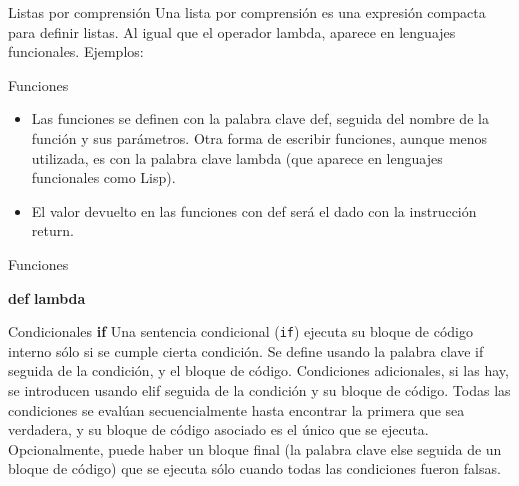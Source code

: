 \documentclass[handout,hyperref={colorlinks=true}]{beamer}
\begin{document}
\begin{frame}{Listas por comprensión}
Una lista por comprensión es una expresión compacta para definir listas. Al igual que el operador lambda, aparece en lenguajes funcionales. Ejemplos:

\lstI
\end{frame}





\begin{frame}{Funciones}
\begin{itemize}

  \item<+->  Las funciones se definen con la palabra clave def, seguida del nombre de la función y sus parámetros. Otra forma de escribir funciones, aunque menos utilizada, es con la palabra clave lambda (que aparece en lenguajes funcionales como Lisp).
  \item<+->  El valor devuelto en las funciones con def será el dado con la instrucción return.
  \end{itemize}

\end{frame}
\begin{frame}{Funciones}

 \textbf{def}
\lstI
\textbf{lambda}
\lstII
\end{frame}


\begin{frame}{Condicionales}
\textbf{if} Una sentencia condicional (\verb~if~) ejecuta su bloque de código interno sólo si se cumple cierta condición. Se define usando la palabra clave if seguida de la condición, y el bloque de código. Condiciones adicionales, si las hay, se introducen usando elif seguida de la condición y su bloque de código. Todas las condiciones se evalúan secuencialmente hasta encontrar la primera que sea verdadera, y su bloque de código asociado es el único que se ejecuta. Opcionalmente, puede haber un bloque final (la palabra clave else seguida de un bloque de código) que se ejecuta sólo cuando todas las condiciones fueron falsas.

\end{frame}
\end{document}
